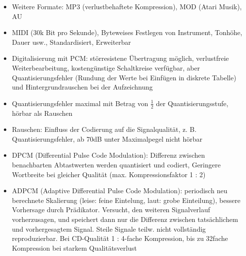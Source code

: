 \documentclass[12pt,landscape]{article}
\begin{document}
\begin{multicols}{3}
\begin{itemize}
\item Weitere Formate: MP3 (verlustbehaftete Kompression), MOD (Atari Musik), AU
\item MIDI (30k Bit pro Sekunde), Byteweises Festlegen von Instrument, Tonhöhe, Dauer usw., Standardisiert, Erweiterbar
\item Digitalisierung mit PCM: störresistene Übertragung möglich, verlustfreie Weiterbearbeitung, kostengünstige Schaltkreise verfügbar, aber Quantisierungsfehler (Rundung der Werte bei Einfügen in diskrete Tabelle) und Hintergrundrauschen bei der Aufzeichnung
\item Quantisierungsfehler maximal mit Betrag von $\frac{1}{2}$ der Quantisierungsstufe, hörbar als Rauschen
\item Rauschen: Einfluss der Codierung auf die Signalqualität, z. B. Quantisierungsfehler, ab 70dB unter Maximalpegel nicht hörbar
\item DPCM (Differential Pulse Code Modulation): Differenz zwischen benachbarten Abtastwerten werden quantisiert und codiert, Geringere Wortbreite bei gleicher Qualität (max. Kompressionsfaktor 1 : 2)
\item ADPCM (Adaptive Differential Pulse Code Modulation): periodisch neu berechnete Skalierung (leise: feine Eintelung, laut: grobe Einteilung), bessere Vorhersage durch Prädikator. Versucht, den weiteren Signalverlauf vorherzusagen, und speichert dann nur die Differenz zwischen tatsächlichem und vorhergesagtem Signal. Steile Signale teilw. nicht vollständig reproduzierbar. Bei CD-Qualität 1 : 4-fache Kompression, bis zu 32fache Kompression bei starkem Qualitätsverlust
\end{itemize}

\end{multicols}
\end{document}
